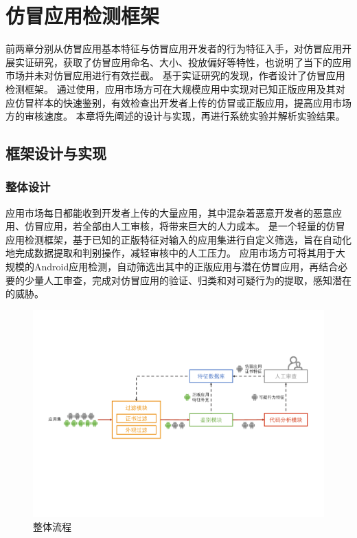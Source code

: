 \chapter{仿冒应用检测框架\mytool}
\label{chp:framework_prototype}

前两章分别从仿冒应用基本特征与仿冒应用开发者的行为特征入手，对仿冒应用开展实证研究，获取了仿冒应用命名、大小、投放偏好等特性，也说明了当下的应用市场并未对仿冒应用进行有效拦截。
基于实证研究的发现，作者设计了仿冒应用检测框架\mytool 。
通过使用\mytool ，应用市场方可在大规模应用中实现对已知正版应用及其对应仿冒样本的快速鉴别，有效检查出开发者上传的仿冒或正版应用，提高应用市场方的审核速度。
本章将先阐述\mytool 的设计与实现，再进行系统实验并解析实验结果。

\section{框架设计与实现}

\subsection{整体设计}
应用市场每日都能收到开发者上传的大量应用，其中混杂着恶意开发者的恶意应用、仿冒应用，若全部由人工审核，将带来巨大的人力成本。
\mytool 是一个轻量的仿冒应用检测框架，基于已知的正版特征对输入的应用集进行自定义筛选，旨在自动化地完成数据提取和判别操作，减轻审核中的人工压力。
应用市场方可将其用于大规模的Android应用检测，自动筛选出其中的正版应用与潜在仿冒应用，再结合必要的少量人工审查，完成对仿冒应用的验证、归类和对可疑行为的提取，感知潜在的威胁。

\begin{figure}[htbp]
    \centering
    \includegraphics[width=\textwidth]{./Figures/edwin-fakerevealer-detector}
    \caption{\mytool 整体流程}
    \label{fig:Workflow_detector}
    \vspace{-3mm}
\end{figure}

